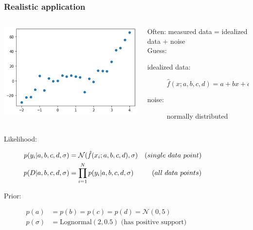 \documentclass[t,aspectratio=169]{beamer}
\begin{document}
\begin{frame}
  \frametitle{Realistic application}
  \begin{columns}
    \begin{column}[T]{0.35\textwidth}
      {\centering
        \includegraphics[width=\textwidth]{images/polyfit_data.png}
      }
    \end{column}
    \begin{column}[T]{0.6\textwidth}
      Often: measured data = idealized data + noise\\
      \bigskip
      Guess: 
      \begin{description}
      \item[idealized data:] $\hat f(x; a, b, c, d)=a + bx + cx^2 + dx^3$
      \item[\phantom{zed data}noise:] normally distributed
      \end{description}
    \end{column}
  \end{columns}
  \begin{description}
  \item[Likelihood:]$\begin{aligned} p(y_i|a,b,c,d,\sigma)&=\mathcal{N}(\hat f(x_i; a, b, c, d), \sigma) &\text(single\ data\ point) \\ p(D|a,b,c,d,\sigma)&=\prod_{i=1}^Np(y_i|a,b,c,d,\sigma) &\text(all\ data\ points) \end{aligned}$
  \item[Prior:] $\begin{aligned}
      p(a)       &=p(b)=p(c)=p(d)=\mathcal{N}(0, 5) \\
      p(\sigma) &=\mathrm{Lognormal}(2, 0.5) \text{\ (has positive\ support)}
    \end{aligned}$
  \end{description}
    
\end{frame}
\end{document}
